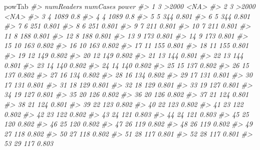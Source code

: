 \documentclass[]{book}
\newenvironment{Shaded}{\begin{snugshade}}{\end{snugshade}}
\newcommand{\CommentTok}[1]{\textcolor[rgb]{0.56,0.35,0.01}{\textit{#1}}}
\newcommand{\NormalTok}[1]{#1}
\begin{document}
\begin{Shaded}
\begin{Highlighting}[]
\NormalTok{powTab}
\CommentTok{#>     numReaders numCases power}
\CommentTok{#> 1            3    >2000  <NA>}
\CommentTok{#> 2            3    >2000  <NA>}
\CommentTok{#> 3            4     1089   0.8}
\CommentTok{#> 4            4     1089   0.8}
\CommentTok{#> 5            5      344 0.801}
\CommentTok{#> 6            5      344 0.801}
\CommentTok{#> 7            6      251 0.801}
\CommentTok{#> 8            6      251 0.801}
\CommentTok{#> 9            7      211 0.801}
\CommentTok{#> 10           7      211 0.801}
\CommentTok{#> 11           8      188 0.801}
\CommentTok{#> 12           8      188 0.801}
\CommentTok{#> 13           9      173 0.801}
\CommentTok{#> 14           9      173 0.801}
\CommentTok{#> 15          10      163 0.802}
\CommentTok{#> 16          10      163 0.802}
\CommentTok{#> 17          11      155 0.801}
\CommentTok{#> 18          11      155 0.801}
\CommentTok{#> 19          12      149 0.802}
\CommentTok{#> 20          12      149 0.802}
\CommentTok{#> 21          13      144 0.801}
\CommentTok{#> 22          13      144 0.801}
\CommentTok{#> 23          14      140 0.802}
\CommentTok{#> 24          14      140 0.802}
\CommentTok{#> 25          15      137 0.802}
\CommentTok{#> 26          15      137 0.802}
\CommentTok{#> 27          16      134 0.802}
\CommentTok{#> 28          16      134 0.802}
\CommentTok{#> 29          17      131 0.801}
\CommentTok{#> 30          17      131 0.801}
\CommentTok{#> 31          18      129 0.801}
\CommentTok{#> 32          18      129 0.801}
\CommentTok{#> 33          19      127 0.801}
\CommentTok{#> 34          19      127 0.801}
\CommentTok{#> 35          20      126 0.802}
\CommentTok{#> 36          20      126 0.802}
\CommentTok{#> 37          21      124 0.801}
\CommentTok{#> 38          21      124 0.801}
\CommentTok{#> 39          22      123 0.802}
\CommentTok{#> 40          22      123 0.802}
\CommentTok{#> 41          23      122 0.802}
\CommentTok{#> 42          23      122 0.802}
\CommentTok{#> 43          24      121 0.803}
\CommentTok{#> 44          24      121 0.803}
\CommentTok{#> 45          25      120 0.802}
\CommentTok{#> 46          25      120 0.802}
\CommentTok{#> 47          26      119 0.802}
\CommentTok{#> 48          26      119 0.802}
\CommentTok{#> 49          27      118 0.802}
\CommentTok{#> 50          27      118 0.802}
\CommentTok{#> 51          28      117 0.801}
\CommentTok{#> 52          28      117 0.801}
\CommentTok{#> 53          29      117 0.803}

\end{Highlighting}
\end{Shaded}
\end{document}

